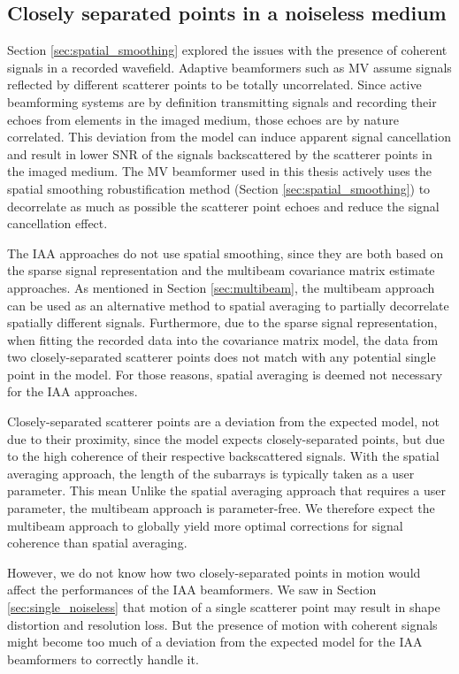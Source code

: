 \clearpage
\subsection{Closely separated points in a noiseless medium}
\label{sec:twopoints_noiseless}
Section \ref{sec:spatial_smoothing} explored the issues with the presence of coherent signals in a recorded wavefield. Adaptive beamformers such as MV assume signals reflected by different scatterer points to be totally uncorrelated. Since active beamforming systems are by definition transmitting signals and recording their echoes from elements in the imaged medium, those echoes are by nature correlated.
This deviation from the model can induce apparent signal cancellation and result in lower SNR of the signals backscattered by the scatterer points in the imaged medium. The MV beamformer used in this thesis actively uses the spatial smoothing robustification method (Section \ref{sec:spatial_smoothing}) to decorrelate as much as possible the scatterer point echoes and reduce the signal cancellation effect.

The IAA approaches do not use spatial smoothing, since they are both based on the sparse signal representation and the multibeam covariance matrix estimate approaches.
As mentioned in Section \ref{sec:multibeam}, the multibeam approach can be used as an alternative method to spatial averaging to partially decorrelate spatially different signals.
Furthermore, due to the sparse signal representation, when fitting the recorded data into the covariance matrix model, the data from two closely-separated scatterer points does not match with any potential single point in the model.
For those reasons, spatial averaging is deemed not necessary for the IAA approaches.

Closely-separated scatterer points are a deviation from the expected model, not due to their proximity, since the model expects closely-separated points, but due to the high coherence of their respective backscattered signals.
With the spatial averaging approach, the length of the subarrays is typically taken as a user parameter. This mean 
Unlike the spatial averaging approach that requires a user parameter, the multibeam approach is parameter-free.
We therefore expect the multibeam approach to globally yield more optimal corrections for signal coherence than spatial averaging.

However, we do not know how two closely-separated points in motion would affect the performances of the IAA beamformers.
We saw in Section \ref{sec:single_noiseless} that motion of a single scatterer point may result in shape distortion and resolution loss.
But the presence of motion with coherent signals might become too much of a deviation from the expected model for the IAA beamformers to correctly handle it.

